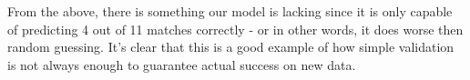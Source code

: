 From the above, there is something our model is lacking since it is only capable of predicting 4 out of 11 matches correctly - or in other words, it does worse then random guessing. It's clear that this is a good example of how simple validation is not always enough to guarantee actual success on new data.

\begin{figure}[t]
\centering
{}
\quad
{}
\quad
{}
\quad
{}
\quad
{}

\end{figure}
